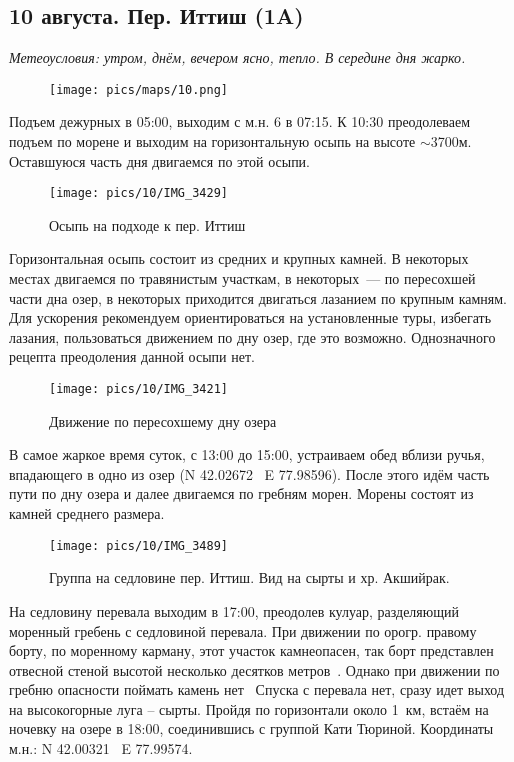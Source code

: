 \subsection{10 августа. Пер. Иттиш (1A)}
\textit{Метеоусловия: утром, днём, вечером ясно, тепло. В середине дня жарко.}

\begin{figure}[h!]
	\centering
		\texttt{[image: pics/maps/10.png]}
	\label{fig:mini_10}
\end{figure}

Подъем дежурных в 05:00, выходим с м.н. 6 в 07:15. К 10:30 преодолеваем подъем по морене и выходим на горизонтальную осыпь на высоте $\sim$3700м. Оставшуюся часть дня двигаемся по этой осыпи.

\begin{figure}[h!]
	\centering
	\texttt{[image: pics/10/IMG\_3429]}
	\caption{Осыпь на подходе к пер. Иттиш}
	\label{fig:IMG_3429}
\end{figure}

Горизонтальная осыпь состоит из средних и крупных камней. В некоторых местах двигаемся по травянистым участкам, в некоторых~--- по пересохшей части дна озер, в некоторых приходится двигаться лазанием по крупным камням. Для ускорения рекомендуем ориентироваться на установленные туры, избегать лазания, пользоваться движением по дну озер, где это возможно. Однозначного рецепта преодоления данной осыпи нет.

\begin{figure}[h!]
	\centering
	\texttt{[image: pics/10/IMG\_3421]}
	\caption{Движение по пересохшему дну озера}
	\label{fig:IMG_3421}
\end{figure}

В самое жаркое время суток, с 13:00 до 15:00, устраиваем обед вблизи ручья, впадающего в одно из озер (N 42.02672\degree~ E 77.98596\degree). После этого идём часть пути по дну озера и далее двигаемся по гребням морен. Морены состоят из камней среднего размера.

\begin{figure}[h!]
	\centering
	\texttt{[image: pics/10/IMG\_3489]}
	\caption{Группа на седловине пер. Иттиш. Вид на сырты и хр. Акшийрак.}
	\label{fig:IMG_3489}
\end{figure}

На седловину перевала выходим в 17:00, преодолев кулуар, разделяющий моренный гребень с седловиной перевала. При движении по орогр. правому борту, по моренному карману, этот участок камнеопасен, так борт представлен отвесной стеной высотой несколько десятков метров~\cite{kovinov2021}. Однако при движении по гребню опасности поймать камень нет~\cite{tipsina2024} Спуска с перевала нет, сразу идет выход на высокогорные луга -- сырты. Пройдя по горизонтали около 1~км, встаём на ночевку на озере в 18:00, соединившись с группой Кати Тюриной. Координаты м.н.: N 42.00321\degree~ E 77.99574\degree.

